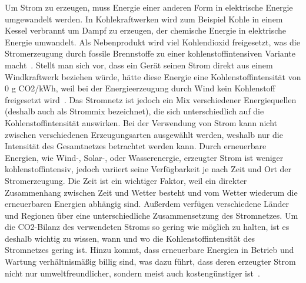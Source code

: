 Um Strom zu erzeugen, muss Energie einer anderen Form in elektrische Energie umgewandelt werden.
In Kohlekraftwerken wird zum Beispiel Kohle in einem Kessel verbrannt um Dampf zu erzeugen, der chemische Energie in elektrische Energie umwandelt.
Als Nebenprodukt wird viel Kohlendioxid freigesetzt, was die Stromerzeugung durch fossile Brennstoffe zu einer kohlenstoffintensiven Variante macht~\cite{Currie.2024}.
Stellt man sich vor, dass ein Gerät seinen Strom direkt aus einem Windkraftwerk beziehen würde, hätte diese Energie eine Kohlenstoffintensität von 0 g \ac{CO2}/\ac{kWh}, weil bei der Energieerzeugung durch Wind kein Kohlenstoff freigesetzt wird~\cite{GreenSoftwareFoundation.2022}.
Das Stromnetz ist jedoch ein Mix verschiedener Energiequellen (deshalb auch als Strommix bezeichnet), die sich unterschiedlich auf die Kohlenstoffintensität auswirken.
Bei der Verwendung von Strom kann nicht zwischen verschiedenen Erzeugungsarten ausgewählt werden, weshalb nur die Intensität des Gesamtnetzes betrachtet werden kann.
Durch erneuerbare Energien, wie Wind-, Solar-, oder Wasserenergie, erzeugter Strom ist weniger kohlenstoffintensiv, jedoch variiert seine Verfügbarkeit je nach Zeit und Ort der Stromerzeugung.
Die Zeit ist ein wichtiger Faktor, weil ein direkter Zusammenhang zwischen Zeit und Wetter besteht und vom Wetter wiederum die erneuerbaren Energien abhängig sind.
Außerdem verfügen verschiedene Länder und Regionen über eine unterschiedliche Zusammensetzung des Stromnetzes.
Um die \ac{CO2}-Bilanz des verwendeten Stroms so gering wie möglich zu halten, ist es deshalb wichtig zu wissen, wann und wo die Kohlenstoffintensität des Stromnetzes gering ist.
Hinzu kommt, dass erneuerbare Energien in Betrieb und Wartung verhältnismäßig billig sind, was dazu führt, dass deren erzeugter Strom nicht nur umweltfreundlicher, sondern meist auch kostengünstiger ist~\cite{NationalGrid.20231106T13:28:05.000Z}.

